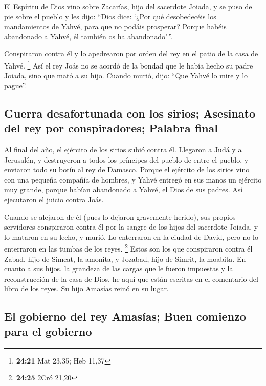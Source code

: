  El Espíritu de Dios vino sobre Zacarías, hijo del
sacerdote Joiada, y se puso de pie sobre el pueblo y les dijo: ``Dios
dice: `¿Por qué desobedecéis los mandamientos de Yahvé, para que no
podáis prosperar? Porque habéis abandonado a Yahvé, él también os ha
abandonado'\,''.

 Conspiraron contra él y lo apedrearon por orden del rey
en el patio de la casa de Yahvé. \footnote{\textbf{24:21} Mat 23,35; Heb
  11,37}  Así el rey Joás no se acordó de la bondad que
le había hecho su padre Joiada, sino que mató a su hijo. Cuando murió,
dijo: ``Que Yahvé lo mire y lo pague''.

\hypertarget{guerra-desafortunada-con-los-sirios-asesinato-del-rey-por-conspiradores-palabra-final}{%
\subsection{Guerra desafortunada con los sirios; Asesinato del rey por
conspiradores; Palabra
final}\label{guerra-desafortunada-con-los-sirios-asesinato-del-rey-por-conspiradores-palabra-final}}

 Al final del año, el ejército de los sirios subió contra
él. Llegaron a Judá y a Jerusalén, y destruyeron a todos los príncipes
del pueblo de entre el pueblo, y enviaron todo su botín al rey de
Damasco.  Porque el ejército de los sirios vino con una
pequeña compañía de hombres, y Yahvé entregó en sus manos un ejército
muy grande, porque habían abandonado a Yahvé, el Dios de sus padres. Así
ejecutaron el juicio contra Joás.

 Cuando se alejaron de él (pues lo dejaron gravemente
herido), sus propios servidores conspiraron contra él por la sangre de
los hijos del sacerdote Joiada, y lo mataron en su lecho, y murió. Lo
enterraron en la ciudad de David, pero no lo enterraron en las tumbas de
los reyes. \footnote{\textbf{24:25} 2Cró 21,20}  Estos
son los que conspiraron contra él Zabad, hijo de Simeat, la amonita, y
Jozabad, hijo de Simrit, la moabita.  En cuanto a sus
hijos, la grandeza de las cargas que le fueron impuestas y la
reconstrucción de la casa de Dios, he aquí que están escritas en el
comentario del libro de los reyes. Su hijo Amasías reinó en su lugar.

\hypertarget{el-gobierno-del-rey-amasuxedas-buen-comienzo-para-el-gobierno}{%
\subsection{El gobierno del rey Amasías; Buen comienzo para el
gobierno}\label{el-gobierno-del-rey-amasuxedas-buen-comienzo-para-el-gobierno}}

